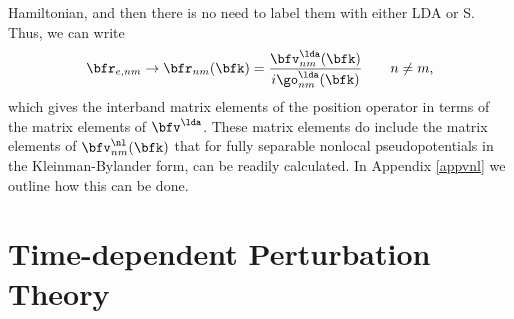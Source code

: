 \documentclass[floatfix,prb,aps,superscriptaddress,11pt,preprint,letterpaper]{revtex4}
\begin{document}
Hamiltonian, and then there is no need to label them with either LDA
or S. Thus,
we can write
\begin{equation}\label{chon.98}
\bfr_{e,nm}\to
\bfr_{nm}(\bfk)=\frac{\bfv^\lda_{nm}(\bfk)}{i\go^\lda_{nm}(\bfk)}
\quad\quad n\ne m
,
\end{equation}   
which gives the interband matrix elements of the position operator
in terms of the matrix elements of $\bfv^\lda$. 
These matrix elements do include the matrix elements of
$\bfv^\nl_{nm}(\bfk)$ that
for fully  separable nonlocal pseudopotentials in the 
Kleinman-Bylander 
form,\cite{motta_implementation_2010,kleinman_efficacious_1982,adolph_nonlocality_1996}
can be readily calculated.\cite{francesco}
In Appendix \ref{appvnl} we outline how this  
can be done. 



\section{Time-dependent Perturbation Theory}\label{tdpt}
\end{document}
